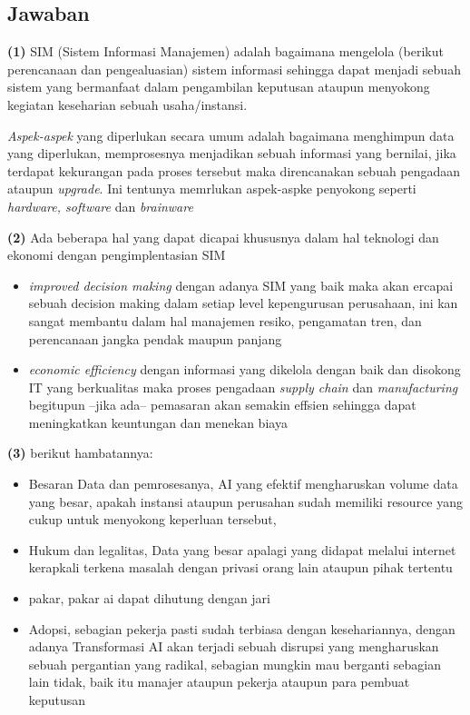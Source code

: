 \documentclass{article}
\begin{document}
\subsection*{Jawaban}
\textbf{(1)}
SIM (Sistem Informasi Manajemen) adalah bagaimana mengelola (berikut perencanaan dan pengealuasian) sistem informasi sehingga dapat menjadi sebuah sistem yang bermanfaat dalam pengambilan keputusan ataupun menyokong kegiatan keseharian sebuah usaha/instansi. 

\emph{Aspek-aspek} yang diperlukan secara umum adalah bagaimana menghimpun data yang diperlukan, memprosesnya menjadikan sebuah informasi yang bernilai, jika terdapat kekurangan pada proses tersebut maka direncanakan sebuah pengadaan ataupun \emph{upgrade}. Ini tentunya memrlukan aspek-aspke penyokong seperti \emph{hardware, software} dan \emph{brainware} 

\textbf{(2)} Ada beberapa hal yang dapat dicapai khususnya dalam hal teknologi dan ekonomi dengan pengimplentasian SIM
\begin{itemize}
    \item \emph{improved decision making} dengan adanya SIM yang baik maka akan ercapai sebuah decision making dalam setiap level kepengurusan perusahaan, ini kan sangat membantu dalam hal manajemen resiko, pengamatan tren, dan perencanaan jangka pendak maupun panjang
    \item \emph{economic efficiency} dengan informasi yang dikelola dengan baik dan disokong IT yang berkualitas maka proses pengadaan \emph{supply chain} dan \emph{manufacturing} begitupun --jika ada-- pemasaran akan semakin effsien sehingga dapat meningkatkan keuntungan dan menekan biaya
\end{itemize} 
\textbf{(3)} berikut hambatannya:
\begin{itemize}
    \item Besaran Data dan pemrosesanya, AI yang efektif mengharuskan volume data yang besar, apakah instansi ataupun perusahan sudah memiliki resource yang cukup untuk menyokong keperluan tersebut, 
    \item Hukum dan legalitas, Data yang besar apalagi yang didapat melalui internet kerapkali terkena masalah dengan privasi orang lain ataupun pihak tertentu
    \item pakar, pakar ai dapat dihutung dengan jari
    \item Adopsi, sebagian pekerja pasti sudah terbiasa dengan kesehariannya, dengan adanya Transformasi AI akan terjadi sebuah disrupsi yang mengharuskan sebuah pergantian yang radikal, sebagian mungkin mau berganti sebagian lain tidak, baik itu manajer ataupun pekerja ataupun para pembuat keputusan 
\end{itemize}
 
\end{document}
